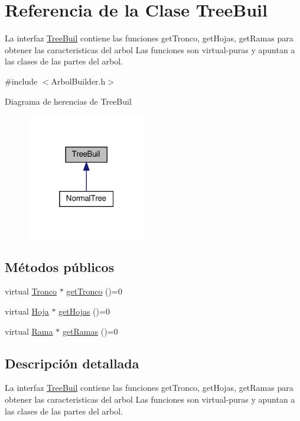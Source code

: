\hypertarget{classTreeBuil}{}\section{Referencia de la Clase Tree\+Buil}
\label{classTreeBuil}


La interfaz \hyperlink{classTreeBuil}{Tree\+Buil} contiene las funciones get\+Tronco, get\+Hojas, get\+Ramas para obtener las caracteristicas del arbol  Las funciones son virtual-\/puras y apuntan a las clases de las partes del arbol.  




{\ttfamily \#include $<$Arbol\+Builder.\+h$>$}



Diagrama de herencias de Tree\+Buil\nopagebreak
\begin{figure}[H]
\begin{center}
\leavevmode
\includegraphics[width=148pt]{classTreeBuil__inherit__graph}
\end{center}
\end{figure}
\subsection*{Métodos públicos}
\begin{DoxyCompactItemize}
\item 
virtual \hyperlink{classTronco}{Tronco} $\ast$ \hyperlink{classTreeBuil_a083d65b3e44e233b9a2a9305bcdabb8c}{get\+Tronco} ()=0
\item 
virtual \hyperlink{classHoja}{Hoja} $\ast$ \hyperlink{classTreeBuil_a76ddaf2d79386ffabe5bf17e0c6d887e}{get\+Hojas} ()=0
\item 
virtual \hyperlink{classRama}{Rama} $\ast$ \hyperlink{classTreeBuil_ad8c90d4466a151a8082eeae13400e6cc}{get\+Ramas} ()=0
\end{DoxyCompactItemize}


\subsection{Descripción detallada}
La interfaz \hyperlink{classTreeBuil}{Tree\+Buil} contiene las funciones get\+Tronco, get\+Hojas, get\+Ramas para obtener las caracteristicas del arbol  Las funciones son virtual-\/puras y apuntan a las clases de las partes del arbol. 


